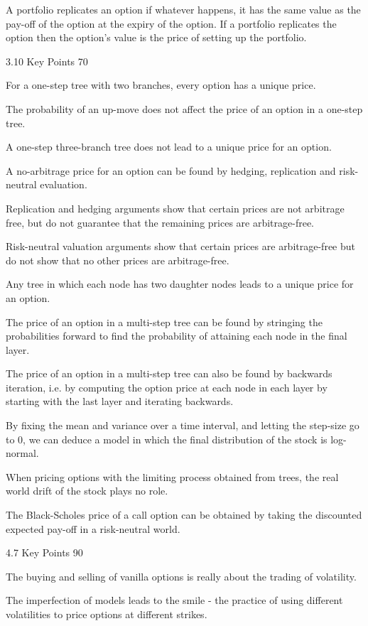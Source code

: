 A portfolio replicates an option if whatever happens, it has the same value as the pay-off of the option at the expiry of the option. If a portfolio replicates the option then the option's value is the price of setting up the portfolio.

3.10 Key Points 70

For a one-step tree with two branches, every option has a unique price.

The probability of an up-move does not affect the price of an option in a one-step tree.

A one-step three-branch tree does not lead to a unique price for an option.

A no-arbitrage price for an option can be found by hedging, replication and risk-neutral evaluation.

Replication and hedging arguments show that certain prices are not arbitrage free, but do not guarantee that the remaining prices are arbitrage-free.

Risk-neutral valuation arguments show that certain prices are arbitrage-free but do not show that no other prices are arbitrage-free.

Any tree in which each node has two daughter nodes leads to a unique price for an option.

The price of an option in a multi-step tree can be found by stringing the probabilities forward to find the probability of attaining each node in the final layer.

The price of an option in a multi-step tree can also be found by backwards iteration, i.e. by computing the option price at each node in each layer by starting with the last layer and iterating backwards.

By fixing the mean and variance over a time interval, and letting the step-size go to $0$, we can deduce a model in which the final distribution of the stock is log-normal.

When pricing options with the limiting process obtained from trees, the real world drift of the stock plays no role.

The Black-Scholes price of a call option can be obtained by taking the discounted expected pay-off in a risk-neutral world.

4.7 Key Points 90

The buying and selling of vanilla options is really about the trading of volatility.

The imperfection of models leads to the smile - the practice of using different volatilities to price options at different strikes.

